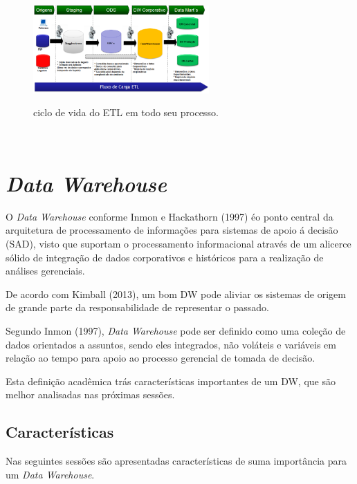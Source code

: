 \begin{figure}[H]
	\vspace*{0,2cm}
    \centering
    \caption{ciclo de vida do ETL em todo seu processo.}
    \includegraphics[width=0.6\textwidth]{./04-figuras/figura-05}
    \label{fig:ilustfig05}
\end{figure}
\vspace*{-0,9cm}
{\raggedright {}}\\

\section{\textit{Data Warehouse}}

O \textit{Data Warehouse} conforme Inmon e Hackathorn (1997) \'{e}o ponto central da arquitetura de processamento de informa\c{c}\~{o}es para sistemas de apoio \'{a} decis\~{a}o (SAD), visto que suportam o processamento informacional atrav\'{e}s de um alicerce s\'{o}lido de integra\c{c}\~{a}o de dados corporativos e hist\'{o}ricos para a realiza\c{c}\~{a}o de an\'{a}lises gerenciais.

De acordo com Kimball (2013), um bom DW pode aliviar os sistemas de origem de grande parte da responsabilidade de representar o passado.

Segundo Inmon (1997), \textit{Data Warehouse} pode ser definido como uma cole\c{c}\~{a}o de dados orientados a assuntos, sendo eles integrados, n\~{a}o vol\'{a}teis e vari\'{a}veis em rela\c{c}\~{a}o ao tempo para apoio ao processo gerencial de tomada de decis\~{a}o.

Esta defini\c{c}\~{a}o acadêmica tr\'{a}s caracter\'{i}sticas importantes de um DW, que s\~{a}o melhor analisadas nas pr\'{o}ximas sess\~{o}es.

\subsection{Caracter\'{i}sticas}

Nas seguintes sess\~{o}es s\~{a}o apresentadas caracter\'{i}sticas de suma importância para um \textit{Data Warehouse}.

